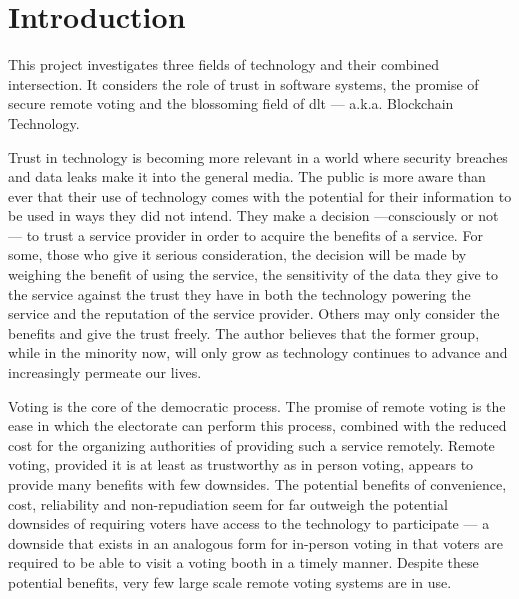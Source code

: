 \chapter{Introduction}
\label{ch:intro}

This project investigates three fields of technology and their combined intersection.
It considers the role of trust in software systems, the promise of secure remote voting and the blossoming field of \gls{dlt} --- a.k.a. Blockchain Technology.

Trust in technology is becoming more relevant in a world where security breaches and data leaks make it into the general media. The public is more aware than ever that their use of technology comes with the potential for their information to be used in ways they did not intend. They make a decision ---consciously or not--- to trust a service provider in order to acquire the benefits of a service. For some, those who give it serious consideration, the decision will be made by weighing the benefit of using the service, the sensitivity of the data they give to the service against the trust they have in both the technology powering the service and the reputation of the service provider. Others may only consider the benefits and give the trust freely. The author believes that the former group, while in the minority now, will only grow as technology continues to advance and increasingly permeate our lives.

Voting is the core of the democratic process. The promise of remote voting is the ease in which the electorate can perform this process, combined with the reduced cost for the organizing authorities of providing such a service remotely. Remote voting, provided it is at least as trustworthy as in person voting, appears to provide many benefits with few downsides. The potential benefits of convenience, cost, reliability and non-repudiation seem for far outweigh the potential downsides of requiring voters have access to the technology to participate --- a downside that exists in an analogous form for in-person voting in that voters are required to be able to visit a voting booth in a timely manner. Despite these potential benefits, very few large scale remote voting systems are in use.

